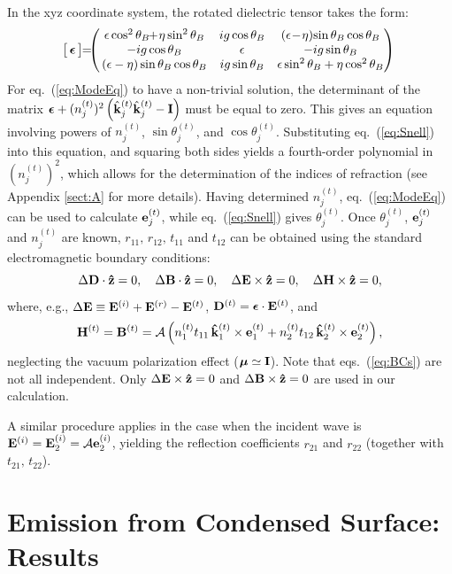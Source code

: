 \documentclass{emulateapj}
\newcommand{\be}{\begin{equation}}
\newcommand{\ee}{\end{equation}}
\newcommand{\cA}{{\cal A}}
\newcommand{\beps}{{\mbox{\boldmath $\epsilon$}}}
\newcommand{\bmu}{{\mbox{\boldmath $\mu$}}}
\newcommand{\bB}{{\bf B}}
\newcommand{\bE}{{\bf E}}
\newcommand{\bD}{{\bf D}}
\newcommand{\bH}{{\bf H}}
\newcommand{\bfe}{{\bf e}}
\newcommand{\bk}{{\bf k}}
\newcommand{\hatz}{{\bf\hat z}}
\newcommand{\snj}{\sin\theta^{(t)}_j }
\newcommand{\cnj}{\cos\theta^{(t)}_j }
\newcommand{\snb}{\sin\theta_{B} }
\newcommand{\cnb}{\cos\theta_{B} }
\newcommand{\snbs}{\sin^2\theta_{B} }
\newcommand{\cnbs}{\cos^2\theta_{B} }
\begin{document}
In the xyz coordinate system, the rotated dielectric tensor takes the form:
\be
\label{eq:RotDie}
\!\bigl[\,\beps\,\bigr] \!\! = \!\!\! \left(\!\!\begin{array}{ccc}
\epsilon\cnbs\!\!+\!\eta\snbs & ig\cnb & (\epsilon\!-\!\eta)\!\snb\cnb\\
-ig\cnb & \epsilon & -ig\snb\\
(\epsilon-\eta)\snb\cnb & ig\snb & \epsilon\snbs+\eta\cnbs
\end{array}\!\!\!\right)
\ee
For eq.~(\ref{eq:ModeEq}) to have a non-trivial solution, the determinant of the matrix
$\beps+(n_j^{(t)})^2\left(\hat\bk^{(t)}_j\hat\bk^{(t)}_j-{\bf I}\right)$
must be equal to 
zero.  This gives an equation involving powers of $n_j^{(t)}$, $\snj$, and $\cnj$.  
Substituting eq.~(\ref{eq:Snell}) into this equation, and squaring both sides yields a fourth-order 
polynomial in $(n_j^{(t)})^2$, which allows for the determination of the indices of 
refraction (see Appendix \ref{sect:A} for more details).  Having determined $n_j^{(t)}$, eq.~(\ref{eq:ModeEq}) 
can be used to calculate $\bfe_j^{(t)}$, while eq.~(\ref{eq:Snell}) gives $\theta_j^{(t)}$.
Once $\theta_j^{(t)}$, $\bfe_j^{(t)}$ and $n_j^{(t)}$ are known,
$r_{11},\,r_{12},\,t_{11}$ and $t_{12}$ can be obtained
using the standard electromagnetic boundary conditions:
\be
\label{eq:BCs}
\Delta\bD\cdot\hatz=0,\quad
\Delta\bB\cdot\hatz=0,\quad
\Delta\bE\times\hatz=0,\quad
\Delta\bH\times\hatz=0,
\ee
where, e.g., $\Delta\bE\equiv \bE^{(i)}+\bE^{(r)}-\bE^{(t)}$, ${\bf D}^{(t)} = \beps\cdot \bE^{(t)}$, and
\be
\bH^{(t)}={\bf B}^{(t)} = \cA \left(
n_1^{(t)} t_{11}\,{\bf\hat k}^{(t)}_1\times {\bf e}^{(t)}_1
+n_2^{(t)} t_{12}\,{\bf\hat k}^{(t)}_2\times {\bf e}^{(t)}_2
\right),
\ee
neglecting the vacuum polarization effect ($\bmu\simeq {\bf I}$).  Note that eqs.~(\ref{eq:BCs}) 
are not all independent.  Only $\Delta\bE\times\hatz=0$ and 
$\Delta\bB\times\hatz=0$ are used in our calculation.

A similar procedure applies in the case when the incident wave is
$\bE^{(i)}=\bE_2^{(i)}=\cA\bfe_2^{(i)}$, yielding the reflection coefficients
$r_{21}$ and $r_{22}$ (together with $t_{21},\,t_{22}$).

\section{Emission from Condensed Surface: Results}
\label{sect:Results}
\end{document}
